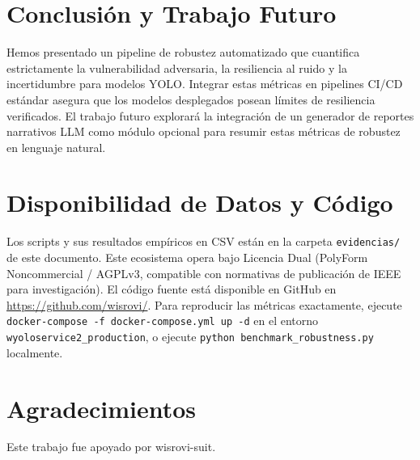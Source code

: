 \documentclass[conference]{IEEEtran}
\begin{document}
\section{Conclusión y Trabajo Futuro}
Hemos presentado un pipeline de robustez automatizado que cuantifica estrictamente la vulnerabilidad adversaria, la resiliencia al ruido y la incertidumbre para modelos YOLO. Integrar estas métricas en pipelines CI/CD estándar asegura que los modelos desplegados posean límites de resiliencia verificados. El trabajo futuro explorará la integración de un generador de reportes narrativos LLM como módulo opcional para resumir estas métricas de robustez en lenguaje natural.

\section*{Disponibilidad de Datos y Código}
Los scripts y sus resultados empíricos en CSV están en la carpeta \texttt{evidencias/} de este documento. Este ecosistema opera bajo Licencia Dual (PolyForm Noncommercial / AGPLv3, compatible con normativas de publicación de IEEE para investigación). El código fuente está disponible en GitHub en \url{https://github.com/wisrovi/}. Para reproducir las métricas exactamente, ejecute \texttt{docker-compose -f docker-compose.yml up -d} en el entorno \texttt{wyoloservice2\_production}, o ejecute \texttt{python benchmark\_robustness.py} localmente.

\section*{Agradecimientos}
Este trabajo fue apoyado por wisrovi-suit.



\end{document}
